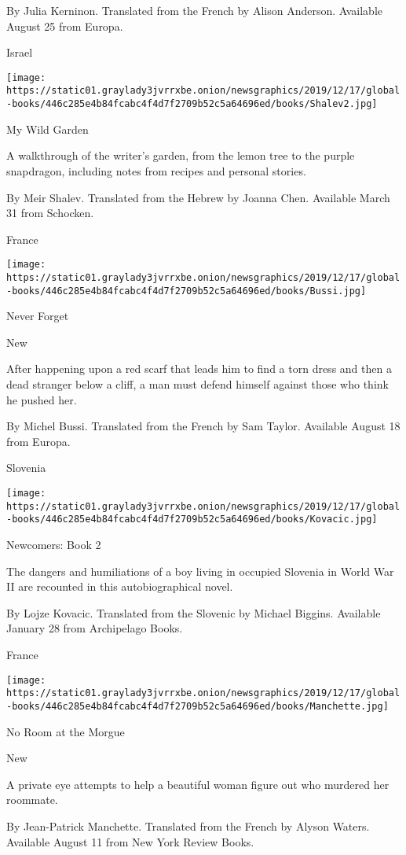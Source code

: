 By Julia Kerninon. Translated from the French by Alison Anderson.
Available August 25 from Europa.

Israel

\texttt{[image: https://static01.graylady3jvrrxbe.onion/newsgraphics/2019/12/17/global-books/446c285e4b84fcabc4f4d7f2709b52c5a64696ed/books/Shalev2.jpg]}

My Wild Garden

A walkthrough of the writer's garden, from the lemon tree to the purple
snapdragon, including notes from recipes and personal stories.

 By Meir Shalev. Translated from the Hebrew by Joanna Chen. Available
March 31 from Schocken.

France

\texttt{[image: https://static01.graylady3jvrrxbe.onion/newsgraphics/2019/12/17/global-books/446c285e4b84fcabc4f4d7f2709b52c5a64696ed/books/Bussi.jpg]}

Never Forget

New

After happening upon a red scarf that leads him to find a torn dress and
then a dead stranger below a cliff, a man must defend himself against
those who think he pushed her.

 By Michel Bussi. Translated from the French by Sam Taylor. Available
August 18 from Europa.

Slovenia

\texttt{[image: https://static01.graylady3jvrrxbe.onion/newsgraphics/2019/12/17/global-books/446c285e4b84fcabc4f4d7f2709b52c5a64696ed/books/Kovacic.jpg]}

Newcomers: Book 2

The dangers and humiliations of a boy living in occupied Slovenia in
World War II are recounted in this autobiographical novel.

 By Lojze Kovacic. Translated from the Slovenic by Michael Biggins.
Available January 28 from Archipelago Books.

France

\texttt{[image: https://static01.graylady3jvrrxbe.onion/newsgraphics/2019/12/17/global-books/446c285e4b84fcabc4f4d7f2709b52c5a64696ed/books/Manchette.jpg]}

No Room at the Morgue

New

A private eye attempts to help a beautiful woman figure out who murdered
her roommate.

 By Jean-Patrick Manchette. Translated from the French by Alyson Waters.
Available August 11 from New York Review Books.

